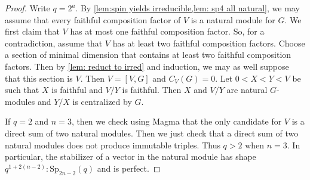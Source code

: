 \documentclass[12pt]{amsart}
\theoremstyle{remark}
\theoremstyle{notation}
\theoremstyle{definition}
\newcommand{\Sp}{\mathrm{Sp}}
\newcommand{\0}{\emptyset}
\begin{document}
  \begin{proof} Write $q=2^a$. By \cref{lem:spin yields irreducible,lem: sp4 all natural}, we may assume that every faithful composition factor of $V$ is a natural module for $G$.
  We first claim that $V$ has at most one faithful composition factor.  So, for a contradiction, assume that $V$ has at least two faithful composition factors.    Choose a section of minimal dimension that contains at least two faithful composition factors.  Then by \cref{lem: reduct to irred} and induction, we may as well suppose that this section is $V$.  Then $V=[V,G]$ and $C_V(G)=0$. Let $0<X<Y<V$ be such that $X$ is faithful and $V/Y$ is  faithful.  Then $X$ and $V/Y$ are natural $G$-modules and $Y/X$ is centralized by $G$.

   If $q=2$ and $n=3$, then we check using {\sc Magma}  that the only candidate for  $V$ is a direct sum of two natural modules.  Then we  just check that a direct sum of two natural modules does not produce immutable triples.  Thus $q> 2$ when $n=3$.
In particular, the stabilizer of a vector in the natural module has shape $q^{1+2(n-2)}{:}\Sp_{2n-2}(q)$ and is perfect.


\end{proof}
\end{document}
